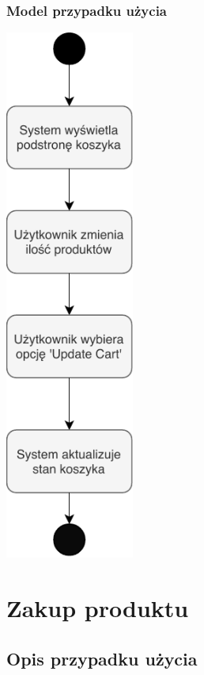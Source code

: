 \documentclass[12pt]{report}
\begin{document}
			\subsubsection{Model przypadku użycia}
				\begin{center}
					\includegraphics[width=120pt]{koszyk2.pdf}
				\end{center}
	
	
	\section{Zakup produktu}
	
		\subsection{Opis przypadku użycia}
		
\end{document}
